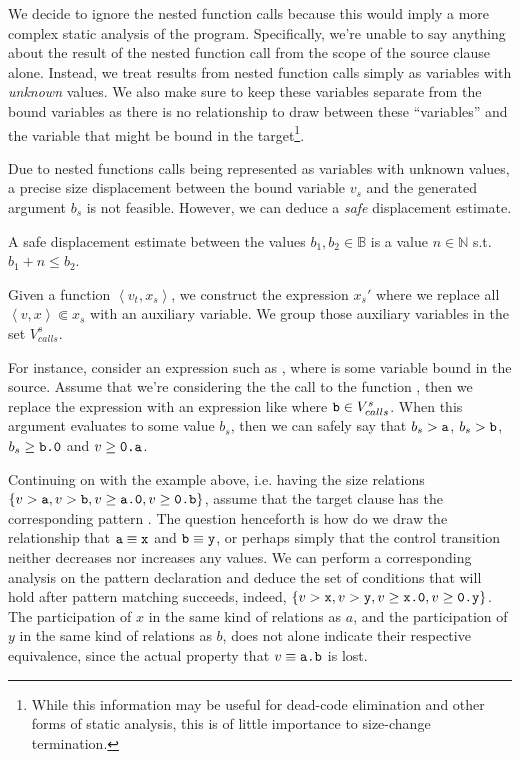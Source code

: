 We decide to ignore the nested function calls because this would imply a more
complex static analysis of the program. Specifically, we're unable to say
anything about the result of the nested function call from the scope of the
source clause alone. Instead, we treat results from nested function calls
simply as variables with \emph{unknown} values. We also make sure to keep these
variables separate from the bound variables as there is no relationship to draw
between these ``variables'' and the variable that might be bound in the
target\footnote{While this information may be useful for dead-code elimination
and other forms of static analysis, this is of little importance to size-change
termination.}.

Due to nested functions calls being represented as variables with unknown
values, a precise size displacement between the bound variable $v_s$ and the
generated argument $b_s$ is not feasible. However, we can deduce a \emph{safe}
displacement estimate.

\begin{definition} A safe displacement estimate between the values
$b_1,b_2\in\mathbb{B}$ is a value $n\in\mathbb{N}$ s.t. $b_1+n\leq
b_2$.\end{definition}

\begin{definition} Given a function $\left\langle v_t,x_s\right\rangle$, we
construct the expression $x_s'$ where we replace all $\left\langle v,x
\right\rangle\Subset x_s$ with an auxiliary variable. We group those auxiliary
variables in the set $V^s_{calls}$.\end{definition} 

For instance, consider an expression such as , where 
is some variable bound in the source. Assume that we're considering the the
call to the function , then we replace the expression 
with an expression like  where $\text{{\ttfamily b}}\in V^s_{calls}$. When this
argument evaluates to some value $b_s$, then we can safely say that
$b_s>\text{{\ttfamily a}}$, $b_s>\text{{\ttfamily b}}$, $b_s\geq\text{{\ttfamily b.0}}$ and
$v\geq\text{{\ttfamily0.a}}$.

Continuing on with the example above, i.e. having the size relations
$\{v>\text{{\ttfamily a}}, v> \text{{\ttfamily b}}, v\geq \text{{\ttfamily a.0}}, v\geq \text{{\ttfamily0.b}}\}$, assume
that the target clause has the corresponding pattern . The question
henceforth is how do we draw the relationship that $\text{{\ttfamily a}}\equiv\text{{\ttfamily x}}$
and $\text{{\ttfamily b}}\equiv\text{{\ttfamily y}}$, or perhaps simply that the control transition
neither decreases nor increases any values. We can perform a corresponding
analysis on the pattern declaration and deduce the set of conditions that will
hold after pattern matching succeeds, indeed, $\{v>\text{{\ttfamily x}}, v> \text{{\ttfamily y}},
v\geq \text{{\ttfamily x.0}}, v\geq \text{{\ttfamily0.y}}\}$. The participation of $x$ in the same
kind of relations as $a$, and the participation of $y$ in the same kind of
relations as $b$, does not alone indicate their respective equivalence, since
the actual property that $v\equiv\text{{\ttfamily a.b}}$ is lost.

